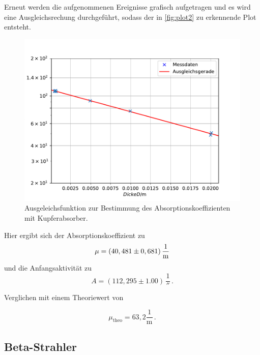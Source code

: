   Erneut werden die aufgenommenen Ereignisse grafisch aufgetragen und es wird eine Ausgleichsrechung durchgeführt, sodass der in \autoref{fig:plot2} zu erkennende Plot entsteht.

  \begin{figure}[H]
      \centering
      \includegraphics{figures/GammaKupfer2.pdf}
      \caption{Ausgeleichsfunktion zur Bestimmung des Absorptionskoeffizienten mit Kupferabsorber.}
      \label{fig:plot2}
  \end{figure}

Hier ergibt sich der Absorptionskoeffizient zu
\begin{equation*}
    \mu =  \left(40,481 \pm 0,681\right) \unit{\frac{1}{\meter}}
\end{equation*}
und die Anfangsaktivität zu
\begin{equation*}
    A = (112,295 \pm 1.00) \, \unit{\frac{1}{\second}} \,.
\end{equation*}

Verglichen mit einem Theoriewert von %

\begin{equation*}
    \mu_{\text{theo}} = 63,2  \dfrac{1}{\unit{\meter}} \,.%
\end{equation*}

\subsection{Beta-Strahler}
\label{sec:Beta-Strahler}

